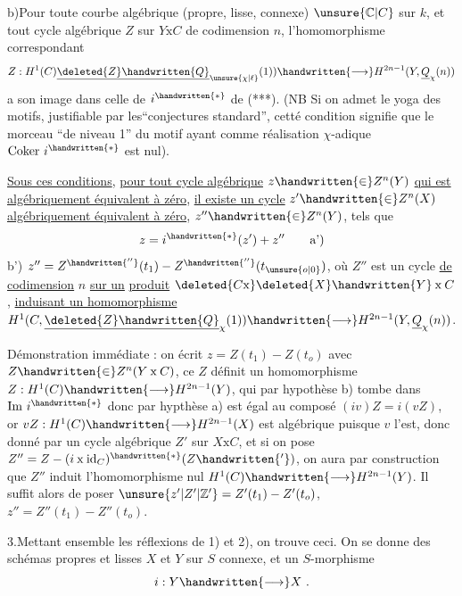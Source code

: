 
b)\quad Pour toute courbe algébrique (propre, lisse, connexe) $\unsure{\mathbb{C}|C}$ sur $k$, et tout cycle algébrique $Z$ sur $Y\mathbin{\mathrm{x}}C$ de codimension $n$, l'homomorphisme correspondant
\[
Z:H^1(C)\underline{\deleted{Z}\handwritten{Q}}_{\unsure{\chi|\ell}}(1))\handwritten{\longrightarrow}H^{2n-1}(Y,\underline{Q}_{\chi}(n))
\]
a son image dans celle de $i^{\handwritten{*}}$ de (***). (NB Si on admet le yoga des motifs, justifiable par les``conjectures standard'', cetté condition signifie que le  morceau  ``de niveau 1'' du motif  ayant comme réalisation $\chi$-adique $\mathrm{Coker}\ i^{\handwritten{*}}$ est nul).

\uline{Sous ces conditions}, \uline{pour tout cycle algébrique} $z\handwritten{\in}Z^n(Y)$ \uline{qui est algébriquement équivalent à zéro}, \uline{il existe un cycle} $z'\handwritten{\in}Z^n(X)$ \uline{algébriquement équivalent à zéro},  $z''\handwritten{\in}Z^n(Y)$, tels que
\[
z=i^{\handwritten{*}}(z')+z''\tag*{a')}
\]
b')\quad {} $z''=Z^{\handwritten{''}}(t_1)-Z^{\handwritten{''}}(t_{\unsure{o|0}})$, où $Z''$ est un cycle \uline{de codimension} $n$ \uline{sur un} \uline{produit} $\deleted{C\mathrm{x}}\deleted{X}\handwritten{Y}\mathbin{\mathrm{x}}C$, \uline{induisant un homomorphisme}   $H^1(C,\underline{\deleted{Z}\handwritten{Q}}_{\chi}(1))\handwritten{\longrightarrow}H^{2n-1}(Y,\underline{Q}_{\chi}(n))$.

Démonstration immédiate : on écrit $z=Z(t_1)-Z(t_o)$ avec $Z\handwritten{\in}Z^n(Y\mathbin{\mathrm{x}}C)$, ce $Z$ définit un homomorphisme $Z:H^1(C)\handwritten{\longrightarrow}H^{2n-1}(Y)$,  qui par hypothèse b) tombe dans $\mathrm{Im}\ i^{\handwritten{*}}$ donc par hypthèse a) est égal au composé $(iv)Z=i(vZ)$, or $vZ:H^1(C)\handwritten{\longrightarrow}H^{2n-1}(X)$ est algébrique puisque $v$ l'est, donc donné par un cycle algébrique $Z'$ sur $X\mathbin{\mathrm{x}}C$, et si on pose $Z''=Z-(i\mathbin{\mathrm{x}}\mathrm{id}_C)^{\handwritten{*}}(Z\handwritten{'})$, on aura par construction que $Z''$ induit l'homomorphisme nul $H^1(C)\handwritten{\longrightarrow}H^{2n-1}(Y)$.  Il suffit alors de poser $\unsure{z'|Z'|\mathbb{Z}'}=Z'(t_1)-Z'(t_o)$, $z''=Z''(t_1)-Z''(t_o)$.

3.\quad Mettant ensemble les réflexions de 1) et 2), on trouve ceci. On se donne des schémas propres et lisses $X$ et $Y$ sur $S$  connexe, et un $S$-morphisme
\[
i:Y\handwritten{\longrightarrow}X\ .
\]
